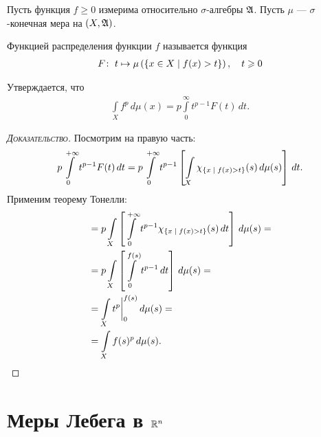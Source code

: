 \begin{exmpl}
 Пусть функция $f \geqslant 0$ измерима относительно $\sigma$-алгебры $\mathfrak{A}$. Пусть $\mu$ --- $\sigma$-конечная мера на $(X, \mathfrak{A})$.

 Функцией распределения функции $f$ называется функция \begin{align*}
  F \colon\; t \mapsto \mu \left( \left\{ x \in X \;\middle|\; f(x) > t \right\} \right), \quad t \geqslant 0
 \end{align*} 

 Утверждается, что \begin{align*}
  \int\limits_{X} f^{p} \, d\mu(x)  = p \int\limits_{0}^{\infty} t^{p-1}F(t) \, dt
 .\end{align*} 
\end{exmpl}
\begin{proof}[\normalfont\textsc{Доказательство}]
 Посмотрим на правую часть: \begin{align*}
  p \int\limits_{0}^{+\infty} t^{p-1}F(t) \, dt = p \int\limits_0^{+\infty} t^{p-1} \left[ \int\limits_{X} \chi_{\left\{ x \;\middle|\; f(x) > t \right\}}(s) \, d\mu(s) \right]   \, dt
 .\end{align*}  Применим теорему Тонелли: \begin{align*}
 &= p \int\limits_{X} \left[ \int\limits_{0}^{+\infty} t^{p - 1}\chi_{\left\{ x \;\middle|\; f(x) > t \right\}}(s) \, dt \right]  \, d\mu(s) = \\
 &=  p \int\limits_{X} \left[ \int\limits_{0}^{f(s)} t^{p-1} \, dt \right]  \, d\mu (s) = \\
 &= \int\limits_{X} t^{p} \bigg\rvert_0^{f(s)} \, d\mu(s)   = \\
 &= \int\limits_{X} f(s)^{p} \, d\mu(s)
 .\end{align*} 
\end{proof}

\section{Меры Лебега в $\mathbb{R}^{n}$}

